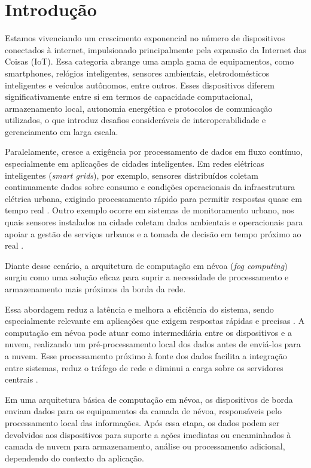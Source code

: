 \chapter{Introdução}\label{cap:introducao}

Estamos vivenciando um crescimento exponencial no número de dispositivos conectados à internet, impulsionado principalmente pela expansão da Internet das Coisas (\gls{IoT}). Essa categoria abrange uma ampla gama de equipamentos, como smartphones, relógios inteligentes, sensores ambientais, eletrodomésticos inteligentes e veículos autônomos, entre outros. Esses dispositivos diferem significativamente entre si em termos de capacidade computacional, armazenamento local, autonomia energética e protocolos de comunicação utilizados, o que introduz desafios consideráveis de interoperabilidade e gerenciamento em larga escala.

Paralelamente, cresce a exigência por processamento de dados em fluxo contínuo, especialmente em aplicações de cidades inteligentes. Em redes elétricas inteligentes (\textit{smart grids}), por exemplo, sensores distribuídos coletam continuamente dados sobre consumo e condições operacionais da infraestrutura elétrica urbana, exigindo processamento rápido para permitir respostas quase em tempo real \cite{khan2021}. Outro exemplo ocorre em sistemas de monitoramento urbano, nos quais sensores instalados na cidade coletam dados ambientais e operacionais para apoiar a gestão de serviços urbanos e a tomada de decisão em tempo próximo ao real \cite{markakis2017}.

Diante desse cenário, a arquitetura de computação em névoa (\textit{fog computing}) surgiu como uma solução eficaz para suprir a necessidade de processamento e armazenamento mais próximos da borda da rede. 

Essa abordagem reduz a latência e melhora a eficiência do sistema, sendo especialmente relevante em aplicações que exigem respostas rápidas e precisas \cite{markakis2017,rahmani2018}. A computação em névoa pode atuar como intermediária entre os dispositivos e a nuvem, realizando um pré-processamento local dos dados antes de enviá-los para a nuvem. Esse processamento próximo à fonte dos dados facilita a integração entre sistemas, reduz o tráfego de rede e diminui a carga sobre os servidores centrais \cite{tseng2018}.

Em uma arquitetura básica de computação em névoa, os dispositivos de borda enviam dados para os equipamentos da camada de névoa, responsáveis pelo processamento local das informações. Após essa etapa, os dados podem ser devolvidos aos dispositivos para suporte a ações imediatas ou encaminhados à camada de nuvem para armazenamento, análise ou processamento adicional, dependendo do contexto da aplicação.

